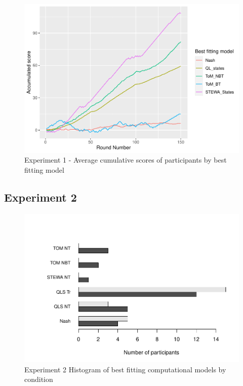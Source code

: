 \documentclass[man,floatsintext]{apa6}
\begin{document}
\begin{figure}

{\centering \includegraphics{draft_report_v3_files/figure-latex/exp1-cumScores-1} 

}

\caption{Experiment 1 - Average cumulative scores of participants by best fitting model}\label{fig:exp1-cumScores}
\end{figure}

\hypertarget{experiment-2}{%
\subsection{Experiment 2}\label{experiment-2}}

\begin{figure}

{\centering \includegraphics{draft_report_v3_files/figure-latex/exp2-comp-models-1} 

}

\caption{Experiment 2 Histogram of best fitting computational models by condition}\label{fig:exp2-comp-models}
\end{figure}
\end{document}
